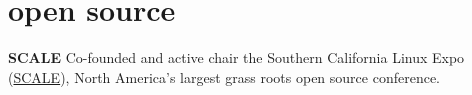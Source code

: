 \section{open source}

\textbf{SCALE}
\newline
\vspace{\parsep}
\newline Co-founded and active chair the Southern California Linux Expo (\href{https://socallinuxexpo.org}{SCALE}), North America's largest grass roots open source conference. 
\vspace{\parsep}
